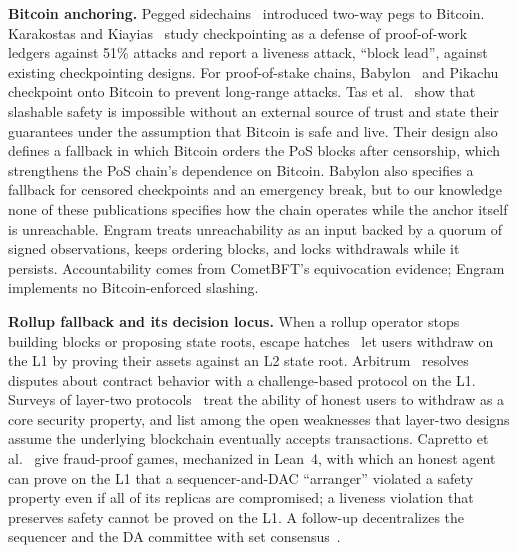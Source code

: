 \textbf{Bitcoin anchoring.}
Pegged sidechains~\cite{back2014sidechains} introduced two-way pegs to Bitcoin.
Karakostas and Kiayias~\cite{karakostas2021checkpointing} study checkpointing
as a defense of proof-of-work ledgers against 51\% attacks and report a
liveness attack, ``block lead'', against existing checkpointing designs. For
proof-of-stake chains, Babylon~\cite{tas2022babylon,tas2023bitcoinpos} and
Pikachu~\cite{azouvi2022pikachu} checkpoint onto Bitcoin to prevent long-range
attacks. Tas et al.~\cite{tas2023bitcoinpos} show that slashable safety is
impossible without an external source of trust and state their guarantees under
the assumption that Bitcoin is safe and live. Their design also defines a
fallback in which Bitcoin orders the PoS blocks after censorship, which
strengthens the PoS chain's dependence on Bitcoin. Babylon also specifies a fallback for censored checkpoints and an emergency break, but to our knowledge none of
these publications specifies how the chain operates while the anchor itself is
unreachable. Engram treats unreachability as an input backed by a quorum of
signed observations, keeps ordering blocks, and locks withdrawals while it
persists. Accountability comes from CometBFT's equivocation evidence; Engram
implements no Bitcoin-enforced slashing.

\textbf{Rollup fallback and its decision locus.}
When a rollup operator stops building blocks or proposing state roots, escape
hatches~\cite{figueira2025escapehatch} let users withdraw on the
L1 by proving their assets against an L2 state root. Arbitrum~\cite{kalodner2018arbitrum} resolves disputes about contract behavior
with a challenge-based protocol on the L1. Surveys of layer-two
protocols~\cite{gudgeon2020sok} treat the ability of honest users to withdraw as
a core security property, and list among the open weaknesses that layer-two
designs assume the underlying blockchain eventually accepts transactions.
Capretto et al.~\cite{capretto2025secure} give fraud-proof games,
mechanized in Lean~4, with which an honest agent can prove on the L1 that a
sequencer-and-DAC ``arranger'' violated a safety property even if all of its
replicas are compromised; a liveness violation that preserves safety cannot be
proved on the L1. A follow-up decentralizes the sequencer and the DA committee
with set consensus~\cite{capretto2026setconsensus}.

